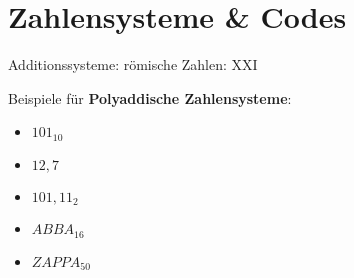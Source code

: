 \documentclass[a4paper]{article}
\begin{document}
	\section{Zahlensysteme \& Codes}
	
	Additionssysteme: römische Zahlen: XXI
	\newline
	
	Beispiele für \textbf{Polyaddische Zahlensysteme}:
	\begin{itemize}
		\item $101_{10}$
		\item $12,7$
		\item $101,11_{2}$
		\item $ABBA_{16}$
		\item $ZAPPA_{50}$
	\end{itemize}
	
	
\end{document}
